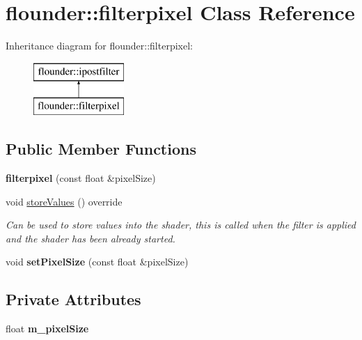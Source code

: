 \hypertarget{classflounder_1_1filterpixel}{}\section{flounder\+:\+:filterpixel Class Reference}
\label{classflounder_1_1filterpixel}
Inheritance diagram for flounder\+:\+:filterpixel\+:\begin{figure}[H]
\begin{center}
\leavevmode
\includegraphics[height=2.000000cm]{classflounder_1_1filterpixel}
\end{center}
\end{figure}
\subsection*{Public Member Functions}
\begin{DoxyCompactItemize}
\item 
\mbox{\label{classflounder_1_1filterpixel_aea7c2593620c495c641ab39031f10595}} 
{\bfseries filterpixel} (const float \&pixel\+Size)
\item 
void \hyperlink{classflounder_1_1filterpixel_abc7ae2b0a9bffd4986a664b690aab416}{store\+Values} () override
\begin{DoxyCompactList}\small\item\em Can be used to store values into the shader, this is called when the filter is applied and the shader has been already started. \end{DoxyCompactList}\item 
\mbox{\label{classflounder_1_1filterpixel_a196e09572387085d6685f0451cc9cb91}} 
void {\bfseries set\+Pixel\+Size} (const float \&pixel\+Size)
\end{DoxyCompactItemize}
\subsection*{Private Attributes}
\begin{DoxyCompactItemize}
\item 
\mbox{\label{classflounder_1_1filterpixel_a01b9df1d3dd3f1854ae908c8dd0f1609}} 
float {\bfseries m\+\_\+pixel\+Size}
\end{DoxyCompactItemize}
